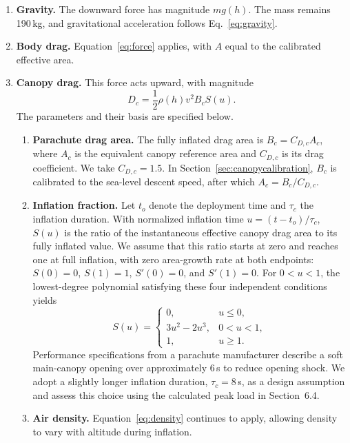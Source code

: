\documentclass[12pt,a4paper]{article}
\numberwithin{equation}{section}
\begin{document}
\begin{enumerate}
\item \textbf{Gravity.} The downward force has magnitude $mg(h)$. The mass remains 190\,kg, and gravitational acceleration follows Eq.~\eqref{eq:gravity}.
\item \textbf{Body drag.} Equation~\eqref{eq:force} applies, with $A$ equal to the calibrated effective area.
\item \textbf{Canopy drag.} This force acts upward, with magnitude
\begin{equation}
 D_c=\frac12\rho(h)v^2B_cS(u).
 \label{eq:canopyforce}
\end{equation}
The parameters and their basis are specified below.
\begin{enumerate}
\renewcommand{\labelenumii}{\arabic{enumii}.}
\item \textbf{Parachute drag area.} The fully inflated drag area is $B_c=C_{D,c}A_c$, where $A_c$ is the equivalent canopy reference area and $C_{D,c}$ is its drag coefficient. We take $C_{D,c}=1.5$. In Section~\ref{sec:canopycalibration}, $B_c$ is calibrated to the sea-level descent speed, after which $A_c=B_c/C_{D,c}$.
\item \textbf{Inflation fraction.} Let $t_o$ denote the deployment time and $\tau_c$ the inflation duration. With normalized inflation time $u=(t-t_o)/\tau_c$, $S(u)$ is the ratio of the instantaneous effective canopy drag area to its fully inflated value. We assume that this ratio starts at zero and reaches one at full inflation, with zero area-growth rate at both endpoints: $S(0)=0$, $S(1)=1$, $S'(0)=0$, and $S'(1)=0$. For $0<u<1$, the lowest-degree polynomial satisfying these four independent conditions yields
\begin{equation*}
 S(u)=\begin{cases}0,&u\le0,\\3u^2-2u^3,&0<u<1,\\1,&u\ge1.\end{cases}
\end{equation*}
Performance specifications from a parachute manufacturer describe a soft main-canopy opening over approximately 6\,s to reduce opening shock. We adopt a slightly longer inflation duration, $\tau_c=8$\,s, as a design assumption and assess this choice using the calculated peak load in Section~6.4.
\item \textbf{Air density.} Equation~\eqref{eq:density} continues to apply, allowing density to vary with altitude during inflation.
\end{enumerate}

\end{enumerate}
\end{document}
